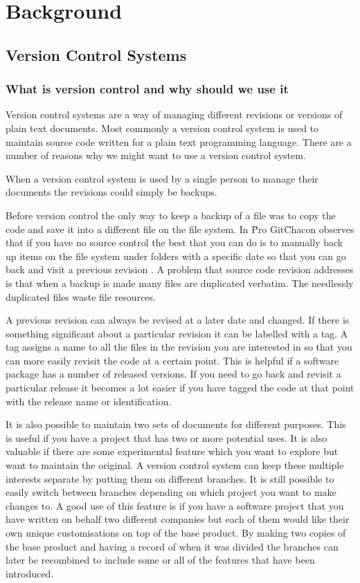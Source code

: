 \chapter{Background}

\section{Version Control Systems}
\subsection{What is version control and why should we use it}
Version control systems are a way of managing different revisions or versions of plain text documents. Most commonly a version control system is used to maintain source code written for a plain text programming language.  There are a number of reasons why we might want to use a version control system.

When a version control system is used by a single person to manage their documents the revisions could simply be backups.

Before version control the only way to keep a backup of a file was to copy the code and save it into a different file on the file system.
In \"Pro Git\" Chacon observes that if you have no source control the best that you can do is to manually back up items on the file system under folders with a specific date so that you can go back and visit a previous revision \cite{Chacon}.  A problem that source code revision addresses is that when a backup is made many files are duplicated verbatim.  The needlessly duplicated files waste file resources.

 A previous revision can always be revised at a later date and changed. If there is something significant about a particular revision it can be labelled with a tag. A tag assigns a name to all the files in the revision you are interested in so that you can more easily revisit the code at a certain point.  This is helpful if a software package has a number of released versions.  If you need to go back and revisit a particular release it becomes a lot easier if you have tagged the code at that point with the release name or identification.

It is also possible to maintain two sets of documents for different purposes. This is useful if you have a project that has two or more potential uses. It is also valuable if there are some experimental feature which you want to explore but want to maintain the original. A version control system can keep these multiple interests separate by putting them on different branches.  It is still possible to easily switch between branches depending on which project you want to make changes to.  A good use of this feature is if you have a software project that you have written on behalf two different companies but each of them would like their own unique customisations on top of the base product.  By making two copies of the base product and having a record of when it was divided the branches can later be recombined to include some or all of the features that have been introduced. 

